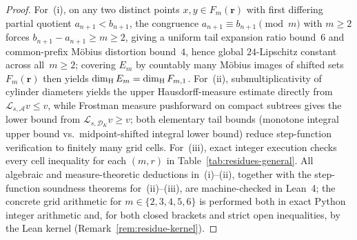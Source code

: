 \begin{proof}
For~(i), on any two distinct points $x,y\in F_m(\mathbf r)$ with first differing
partial quotient $a_{n+1}<b_{n+1}$, the congruence $a_{n+1}\equiv b_{n+1}\pmod m$
with $m\ge2$ forces $b_{n+1}-a_{n+1}\ge m\ge2$, giving a uniform tail expansion
ratio bound~$6$ and common-prefix Möbius distortion bound~$4$, hence global
$24$-Lipschitz constant across all~$m\ge2$; covering $E_m$ by countably many
Möbius images of shifted sets $F_m(\mathbf r)$ then yields $\dim_{\mathrm{H}} E_m=\dim_{\mathrm{H}} F_{m,1}$.
For~(ii), submultiplicativity of cylinder diameters yields the upper
Hausdorff-measure estimate directly from $\mathcal L_{s,\mathcal A}v\le v$, while
Frostman measure pushforward on compact subtrees gives the lower bound from
$\mathcal L_{s,\mathcal D_K}v\ge v$; both elementary tail bounds (monotone
integral upper bound vs.\ midpoint-shifted integral lower bound) reduce step-function
verification to finitely many grid cells. For~(iii), exact integer execution
checks every cell inequality for each $(m,r)$ in Table~\ref{tab:residues-general}.
All algebraic and measure-theoretic deductions in~(i)--(ii), together with the
step-function soundness theorems for~(ii)--(iii), are machine-checked in Lean~4;
the concrete grid arithmetic for $m\in\{2,3,4,5,6\}$ is performed both in exact
Python integer arithmetic and, for both closed brackets and strict open inequalities, by the Lean kernel
(Remark~\ref{rem:residue-kernel}).
\end{proof}


